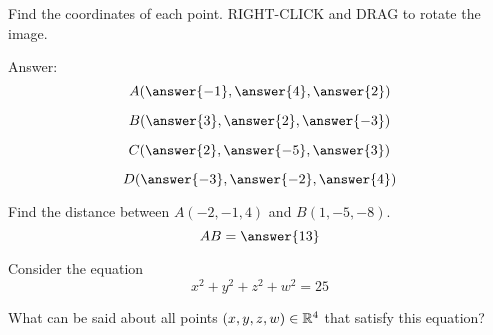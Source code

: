 \documentclass{ximera}
\begin{document}
\begin{problem}\label{prob:geogebrapts}
Find the coordinates of each point.
RIGHT-CLICK and DRAG to rotate the image.  
\begin{center} 
\end{center}

Answer:
  $$A(\answer{-1}, \answer{4}, \answer{2})$$
 
  $$B(\answer{3}, \answer{2}, \answer{-3})$$

  $$C(\answer{2}, \answer{-5}, \answer{3})$$
  
  $$D(\answer{-3}, \answer{-2}, \answer{4})$$

\end{problem}

\begin{problem}\label{prob:distR3}
Find the distance between $A(-2, -1, 4)$ and $B(1, -5, -8)$.
$$AB=\answer{13}$$
\end{problem}

\begin{problem}\label{prob:distR4}
Consider the equation 
$$x^2+y^2+z^2+w^2=25$$

What can be said about all points $(x, y, z, w)\in \mathbb{R}^4$ that satisfy this equation?

\begin{multipleChoice}
  \end{multipleChoice}


\end{problem}
\end{document}
